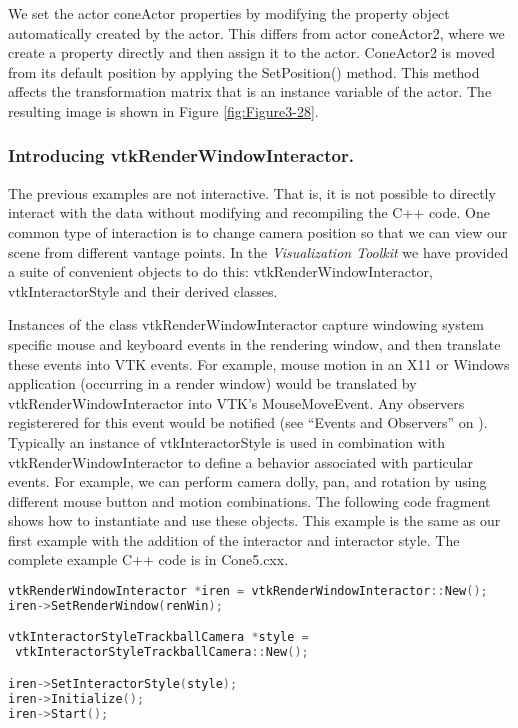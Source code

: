 We set the actor coneActor properties by modifying the property object automatically created by the actor. This differs from actor coneActor2, where we create a property directly and then assign it to the actor. ConeActor2 is moved from its default position by applying the SetPosition() method. This method affects the transformation matrix that is an instance variable of the actor. The resulting image is shown in Figure \ref{fig:Figure3-28}.

\subsubsection{Introducing vtkRenderWindowInteractor.}
\label{pg:rwi}

The previous examples are not interactive. That is, it is not possible to directly interact with the data without modifying and recompiling the C++ code. One common type of interaction is to change camera position so that we can view our scene from different vantage points. In the \emph{Visualization Toolkit} we have provided a suite of convenient objects to do this: vtkRenderWindowInteractor, vtkInteractorStyle and their derived classes.

Instances of the class vtkRenderWindowInteractor capture windowing system specific mouse and keyboard events in the rendering window, and then translate these events into VTK events. For example, mouse motion in an X11 or Windows application (occurring in a render window) would be translated by vtkRenderWindowInteractor into VTK's MouseMoveEvent. Any observers registerered for this event would be notified (see ``Events and Observers'' on \pageref{sub:events_obdervers} ). Typically an instance of vtkInteractorStyle is used in combination with vtkRenderWindowInteractor to define a behavior associated with particular events. For example, we can perform camera dolly, pan, and rotation by using different mouse button and motion combinations. The following code fragment shows how to instantiate and use these objects. This example is the same as our first example with the addition of the interactor and interactor style. The complete example C++ code is in Cone5.cxx.

\begin{lstlisting}[language=C++, caption={Cone5.cxx}]
vtkRenderWindowInteractor *iren = vtkRenderWindowInteractor::New();
iren->SetRenderWindow(renWin);

vtkInteractorStyleTrackballCamera *style =
 vtkInteractorStyleTrackballCamera::New();

iren->SetInteractorStyle(style);
iren->Initialize();
iren->Start();
\end{lstlisting}

